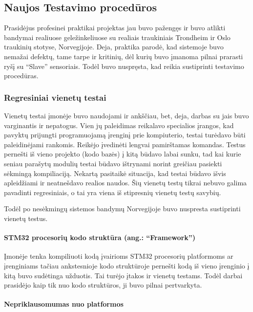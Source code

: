 \documentclass[12pt, a4paper, lithuanian, final]{article}
\begin{document}
\subsection{Naujos Testavimo procedūros}

Prasidėjus profesinei praktikai projektas jau buvo pažengęs ir buvo atlikti bandymai realiuose geležinkeliuose su realiais traukiniais Trondheim ir Oslo traukinių stotyse, Norvegijoje.
Deja, praktika parodė, kad sistemoje buvo nemažai defektų, tame tarpe ir kritinių, dėl kurių buvo įmanoma pilnai prarasti ryšį su "`Slave"' sensoriais.
Todėl buvo nuspręsta, kad reikia sustiprinti testavimo procedūras.

\subsubsection{Regresiniai vienetų testai}

Vienetų testai įmonėje buvo naudojami ir ankščiau, bet, deja, darbas su jais buvo varginantis ir nepatogus.
Vien jų paleidimas reikalavo specialios įrangos, kad pavyktų prijungti programuojamą įrenginį prie kompiuterio,
testai turėdavo būti paleidinėjami rankomis. Reikėjo įvedinėti lengvai pamirštamas komandas.
Testus pernešti iš vieno projekto (kodo bazės) į kitą būdavo labai sunku, tad kai kurie seniau parašytų modulių testai būdavo ištrynami norint greičiau pasiekti sėkmingą kompiliaciją.
Nekartą pasitaikė situacija, kad testai būdavo išvis apleidžiami ir neatnešdavo realios naudos.
Šių vienetų testų tikrai nebuvo galima pavadinti regresiniais, o tai yra viena iš stipresnių vienetų testų savybių.

Todėl po nesėkmingų sistemos bandymų Norvegijoje buvo nuspresta sustiprinti vienetų testus.

\paragraph{STM32 procesorių kodo struktūra (ang.: "`Framework"')}

Įmonėje tenka kompiliuoti kodą įvairioms STM32 procesorių platformoms ar įrenginiams tačiau ankstesnioje kodo struktūroje pernešti kodą iš vieno įrenginio į kitą buvo sudėtinga užduotis.
Tai turėjo įtakos ir vienetų testams.
Todėl darbai prasidėjo kaip tik nuo kodo struktūros, ji buvo pilnai pertvarkyta.


\paragraph{Nepriklausomumas nuo platformos}
\end{document}
